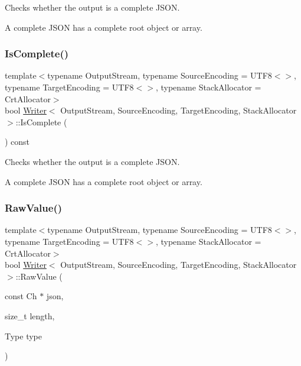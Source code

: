 Checks whether the output is a complete J\+S\+ON. 

A complete J\+S\+ON has a complete root object or array. \mbox{\label{classWriter_a3afe8548b06b9f9601f59fbc0687c79b}} 
\subsubsection{\texorpdfstring{Is\+Complete()}{IsComplete()}\hspace{0.1cm}{\footnotesize\ttfamily [2/2]}}
{\footnotesize\ttfamily template$<$typename Output\+Stream, typename Source\+Encoding = U\+T\+F8$<$$>$, typename Target\+Encoding = U\+T\+F8$<$$>$, typename Stack\+Allocator = Crt\+Allocator$>$ \\
bool \hyperlink{classWriter}{Writer}$<$ Output\+Stream, Source\+Encoding, Target\+Encoding, Stack\+Allocator $>$\+::Is\+Complete (\begin{DoxyParamCaption}{ }\end{DoxyParamCaption}) const\hspace{0.3cm}{\ttfamily [inline]}}



Checks whether the output is a complete J\+S\+ON. 

A complete J\+S\+ON has a complete root object or array. \mbox{\label{classWriter_a35e496982fdbdc7f5d9d29775656cd38}} 
\subsubsection{\texorpdfstring{Raw\+Value()}{RawValue()}}
{\footnotesize\ttfamily template$<$typename Output\+Stream, typename Source\+Encoding = U\+T\+F8$<$$>$, typename Target\+Encoding = U\+T\+F8$<$$>$, typename Stack\+Allocator = Crt\+Allocator$>$ \\
bool \hyperlink{classWriter}{Writer}$<$ Output\+Stream, Source\+Encoding, Target\+Encoding, Stack\+Allocator $>$\+::Raw\+Value (\begin{DoxyParamCaption}\item[{const Ch $\ast$}]{json,  }\item[{size\+\_\+t}]{length,  }\item[{Type}]{type }\end{DoxyParamCaption})\hspace{0.3cm}{\ttfamily [inline]}}



